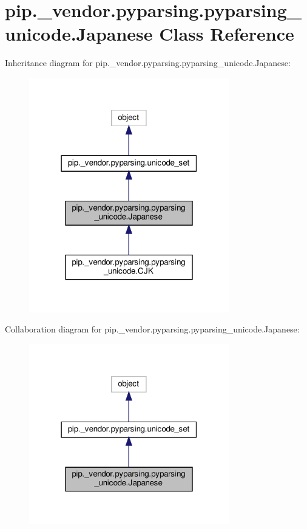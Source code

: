 \hypertarget{classpip_1_1__vendor_1_1pyparsing_1_1pyparsing__unicode_1_1Japanese}{}\section{pip.\+\_\+vendor.\+pyparsing.\+pyparsing\+\_\+unicode.\+Japanese Class Reference}
\label{classpip_1_1__vendor_1_1pyparsing_1_1pyparsing__unicode_1_1Japanese}


Inheritance diagram for pip.\+\_\+vendor.\+pyparsing.\+pyparsing\+\_\+unicode.\+Japanese\+:
\nopagebreak
\begin{figure}[H]
\begin{center}
\leavevmode
\includegraphics[width=247pt]{classpip_1_1__vendor_1_1pyparsing_1_1pyparsing__unicode_1_1Japanese__inherit__graph}
\end{center}
\end{figure}


Collaboration diagram for pip.\+\_\+vendor.\+pyparsing.\+pyparsing\+\_\+unicode.\+Japanese\+:
\nopagebreak
\begin{figure}[H]
\begin{center}
\leavevmode
\includegraphics[width=247pt]{classpip_1_1__vendor_1_1pyparsing_1_1pyparsing__unicode_1_1Japanese__coll__graph}
\end{center}
\end{figure}
